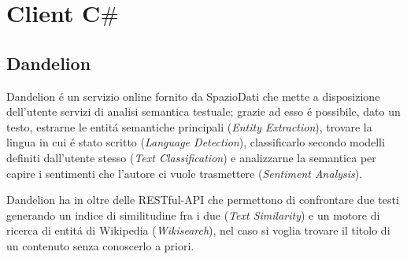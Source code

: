 \chapter{Client C$\#$}

\section{Dandelion}
Dandelion \'e un servizio online fornito da SpazioDati che mette a disposizione dell'utente servizi di analisi semantica testuale; 
grazie ad esso \'e possibile, dato un testo, estrarne le entit\'a semantiche principali (\textit{Entity Extraction}), trovare la lingua in cui \'e stato 
scritto (\textit{Language Detection}), classificarlo secondo modelli definiti dall'utente stesso (\textit{Text Classification}) e analizzarne la semantica 
per capire i sentimenti che l'autore ci vuole trasmettere (\textit{Sentiment Analysis}). 

Dandelion ha in oltre delle RESTful-API che permettono di confrontare due testi generando un indice di similitudine fra i due (\textit{Text Similarity}) e
un motore di ricerca di entit\'a di Wikipedia (\textit{Wikisearch}), nel caso si voglia trovare il titolo di un contenuto senza conoscerlo a priori.


